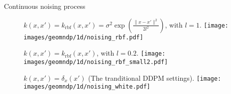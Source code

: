 \begin{frame}{Continuous noising process}
\begin{figure}
    \centering
    $k(x, x') = k_\mathrm{rbf}(x, x') = \sigma^2 \exp\left(\frac{\| x - x' \|^2}{2 l^2} \right)$, with $l = 1$.
    \vspace{-0.7em}
    \texttt{[image: images/geomndp/1d/noising\_rbf.pdf]}
\end{figure}
\pause
\vspace{-0.5em}
\begin{figure}
    \centering
    $k(x, x') = k_\mathrm{rbf}(x, x')$, with $l = 0.2$.
    \vspace{-0.7em}
    \texttt{[image: images/geomndp/1d/noising\_rbf\_small2.pdf]}
\end{figure}
\pause
\vspace{-0.5em}
\begin{figure}
    \centering
    $k(x, x') = \delta_x(x')$ (The tranditional DDPM settings).
    \texttt{[image: images/geomndp/1d/noising\_white.pdf]}
\end{figure}
\end{frame}



    
